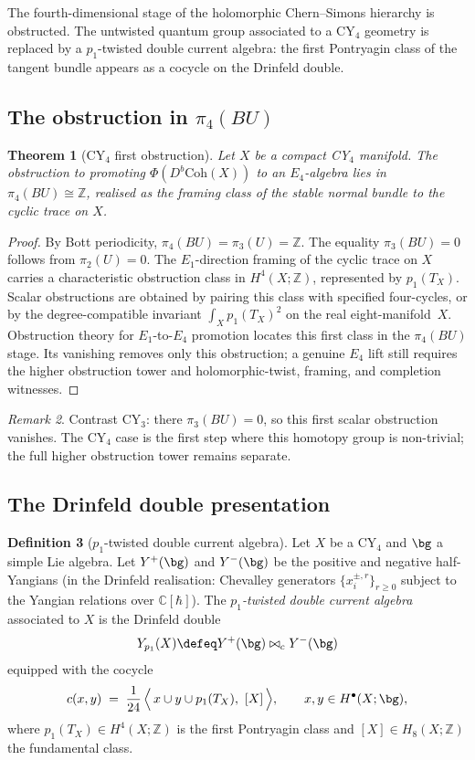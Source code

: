 \documentclass[11pt]{article}
\theoremstyle{plain}
\newtheorem{theorem}{Theorem}[section]
\theoremstyle{definition}
\newtheorem{definition}[theorem]{Definition}
\theoremstyle{remark}
\newtheorem{remark}[theorem]{Remark}
\newcommand{\bC}{\mathbb{C}}
\newcommand{\bZ}{\mathbb{Z}}
\newcommand{\CY}{\mathrm{CY}}
\newcommand{\Coh}{\mathrm{Coh}}
\begin{document}
The fourth-dimensional stage of the holomorphic Chern--Simons
hierarchy is obstructed.  The untwisted quantum group associated to a
CY$_4$ geometry is replaced by a $p_1$-twisted double current algebra:
the first Pontryagin class of the tangent bundle appears as a cocycle
on the Drinfeld double.

\subsection{The obstruction in $\pi_4(BU)$}

\begin{theorem}[CY$_4$ first obstruction]
\label{thm:cy4-obstruction-pi4-BU}
Let $X$ be a compact CY$_4$ manifold. The obstruction to promoting
$\Phi(D^b\Coh(X))$ to an $E_4$-algebra lies in
$\pi_4(BU) \cong \bZ$, realised as the framing class of the stable
normal bundle to the cyclic trace on $X$.
\end{theorem}

\begin{proof}
By Bott periodicity,
$\pi_4(BU) = \pi_3(U) = \bZ$.
The equality $\pi_3(BU)=0$ follows from $\pi_2(U)=0$.  The
$E_1$-direction framing of the cyclic trace on $X$ carries a
characteristic obstruction class in $H^4(X;\bZ)$, represented by
$p_1(T_X)$.  Scalar obstructions are obtained by pairing this class
with specified four-cycles, or by the degree-compatible invariant
$\int_X p_1(T_X)^2$ on the real eight-manifold~$X$.
Obstruction theory for $E_1$-to-$E_4$ promotion locates this first
class in the $\pi_4(BU)$ stage. Its vanishing removes only this
obstruction; a genuine $E_4$ lift still requires the higher
obstruction tower and holomorphic-twist, framing, and completion
witnesses.
\end{proof}

\begin{remark}
Contrast $\CY_3$: there $\pi_3(BU) = 0$, so this first scalar
obstruction vanishes. The CY$_4$ case is the first step where this
homotopy group is non-trivial; the full higher obstruction tower
remains separate.
\end{remark}

\subsection{The Drinfeld double presentation}

\begin{definition}[$p_1$-twisted double current algebra]
\label{def:p1-twisted-double-current}
Let $X$ be a CY$_4$ and $\bg$ a simple Lie algebra.
Let $Y^+(\bg)$ and $Y^-(\bg)$ be the positive and negative
half-Yangians (in the Drinfeld realisation: Chevalley generators
$\{x_i^{\pm,r}\}_{r \ge 0}$ subject to the Yangian relations over
$\bC[\hbar]$).
The \emph{$p_1$-twisted double current algebra} associated to $X$ is
the Drinfeld double
\[
Y_{p_1}(X) \defeq Y^+(\bg) \bowtie_{c} Y^-(\bg)
\]
equipped with the cocycle
\[
c(x, y) \;=\; \frac{1}{24}\,
\Big\langle\, x \cup y \cup p_1(T_X),\ [X] \,\Big\rangle,
\qquad x,y \in H^{\bullet}(X;\bg),
\]
where $p_1(T_X) \in H^4(X;\bZ)$ is the first Pontryagin class and
$[X] \in H_8(X;\bZ)$ the fundamental class.
\end{definition}
\end{document}

